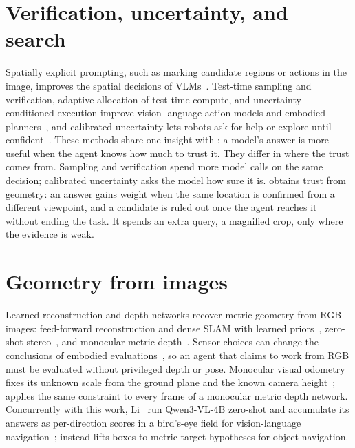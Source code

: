 \section{Verification, uncertainty, and search}
\label{sec:lit-verify}
Spatially explicit prompting, such as marking candidate regions or actions in the image, improves the spatial
decisions of VLMs~\cite{yang2023mark,nasiriany2024pivot,goetting2024navigation}. Test-time sampling and verification,
adaptive allocation of test-time compute, and uncertainty-conditioned execution improve vision-language-action
models and embodied planners~\cite{kwok2025robomonkey,dao2026direct,choi2026scale}, and calibrated uncertainty lets
robots ask for help or explore until confident~\cite{ren2023robots,liang2024introspective,ren2024explore}.
These methods share one insight with \ours: a model's answer is more useful when the agent knows how much to
trust it. They differ in where the trust comes from. Sampling and verification spend more model calls on the same
decision; calibrated uncertainty asks the model how sure it is. \ours obtains trust from geometry: an answer gains
weight when the same location is confirmed from a different viewpoint, and a candidate is ruled out once the agent
reaches it without ending the task. It spends an extra query, a magnified crop, only where the evidence is weak.

\section{Geometry from images}
\label{sec:lit-geometry}
Learned reconstruction and depth networks recover metric geometry from RGB images: feed-forward reconstruction and
dense SLAM with learned priors~\cite{wang2025vggt,murai2024mast,maggio2025vggt}, zero-shot stereo~\cite{wen2025foundationstereo},
and monocular metric depth~\cite{yang2024depthv2,lin2025depth}. Sensor choices can change the conclusions of embodied
evaluations~\cite{corlito2026sensor,wang2025rethinking}, so an agent that claims to work from RGB must be evaluated
without privileged depth or pose. Monocular visual odometry fixes its unknown scale from the ground plane and the
known camera height~\cite{song2014robust}; \ours applies the same constraint to every frame of a monocular metric
depth network. Concurrently with this work, Li~\etal{} run Qwen3-VL-4B zero-shot and accumulate its answers as
per-direction scores in a bird's-eye field for vision-language navigation~\cite{li2026structure}; \ours instead lifts
boxes to metric target hypotheses for object navigation.

